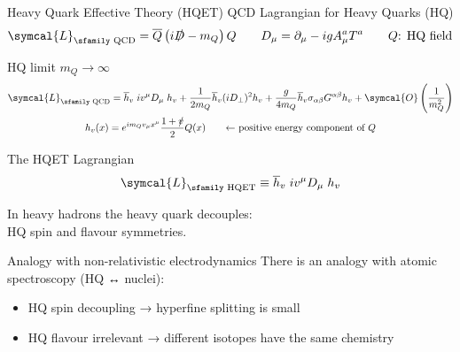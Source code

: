 \documentclass[professionalfonts,aspectratio=169]{beamer}
\newcommand{\adj}[1]{\overline{#1}}
\begin{document}
\begin{frame}{Heavy Quark Effective Theory (HQET)}
  QCD Lagrangian for Heavy Quarks (HQ)
  \begin{equation*}
    \symcal{L}_\text{\sfamily QCD} = \adj{Q} \left( i \slashed{D} - m_Q \right) Q \qquad D_\mu = \partial_\mu - i g A^a_\mu T^a  \qquad \text{$Q$: HQ field}
  \end{equation*}
 
  \begin{block}{HQ limit $m_Q \to \infty$}
%
    \begin{gather*}
      \symcal{L}_{\text{\sfamily QCD}} = \adj{h}_v \left. i v^\mu D_\mu \right. h_v + \frac{1}{2 m_Q} \adj{h}_v (i D_\perp)^2 h_v + \frac{g}{4 m_Q} \adj{h}_v \sigma_{\alpha \beta} G^{\alpha \beta} h_v + \symcal{O}\left( \frac{1}{m_Q^2} \right) \\
      h_v(x) = e^{i m_Q v_\mu x^\mu} \frac{1 + \slashed{v}}{2} Q(x) \qquad \text{← positive energy component of $Q$}%
    \end{gather*}
  \end{block}
 
  \begin{alertblock}{The HQET Lagrangian}
    \begin{equation*}
      \symcal{L}_\text{\sfamily HQET} \equiv \adj{h}_v \left. i v^\mu D_\mu \right. h_v
    \end{equation*}
  \end{alertblock}
\end{frame}

\begin{frame}[standout]
  In heavy hadrons the heavy quark decouples: \\
  HQ spin and flavour symmetries.
\end{frame}

\begin{frame}{Analogy with non-relativistic electrodynamics}
  There is an analogy with atomic spectroscopy (HQ ↔ nuclei):
  \begin{itemize}
    \pause
    \item HQ spin decoupling → hyperfine splitting is small
    \pause
    \item HQ flavour irrelevant → different isotopes have
    the same chemistry
  \end{itemize}
\end{frame}
\end{document}
